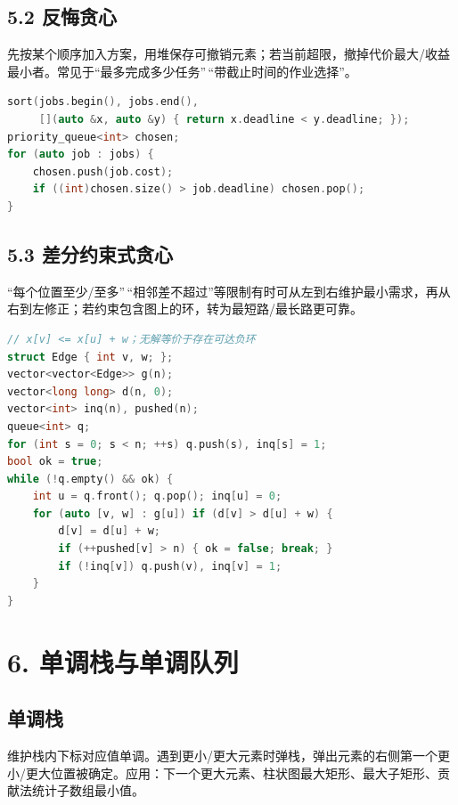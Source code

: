 \subsection{5.2 反悔贪心}\label{ux53cdux6094ux8d2aux5fc3}

先按某个顺序加入方案，用堆保存可撤销元素；若当前超限，撤掉代价最大/收益最小者。常见于``最多完成多少任务''\,``带截止时间的作业选择''。

\begin{lstlisting}[language={C++}]
sort(jobs.begin(), jobs.end(),
     [](auto &x, auto &y) { return x.deadline < y.deadline; });
priority_queue<int> chosen;
for (auto job : jobs) {
    chosen.push(job.cost);
    if ((int)chosen.size() > job.deadline) chosen.pop();
}
\end{lstlisting}

\subsection{5.3 差分约束式贪心}\label{ux5deeux5206ux7ea6ux675fux5f0fux8d2aux5fc3}

``每个位置至少/至多''\,``相邻差不超过''等限制有时可从左到右维护最小需求，再从右到左修正；若约束包含图上的环，转为最短路/最长路更可靠。

\begin{lstlisting}[language={C++}]
// x[v] <= x[u] + w；无解等价于存在可达负环
struct Edge { int v, w; };
vector<vector<Edge>> g(n);
vector<long long> d(n, 0);
vector<int> inq(n), pushed(n);
queue<int> q;
for (int s = 0; s < n; ++s) q.push(s), inq[s] = 1;
bool ok = true;
while (!q.empty() && ok) {
    int u = q.front(); q.pop(); inq[u] = 0;
    for (auto [v, w] : g[u]) if (d[v] > d[u] + w) {
        d[v] = d[u] + w;
        if (++pushed[v] > n) { ok = false; break; }
        if (!inq[v]) q.push(v), inq[v] = 1;
    }
}
\end{lstlisting}

\section{6. 单调栈与单调队列}\label{ux5355ux8c03ux6808ux4e0eux5355ux8c03ux961fux5217}

\subsection{单调栈}\label{ux5355ux8c03ux6808}

维护栈内下标对应值单调。遇到更小/更大元素时弹栈，弹出元素的右侧第一个更小/更大位置被确定。应用：下一个更大元素、柱状图最大矩形、最大子矩形、贡献法统计子数组最小值。

